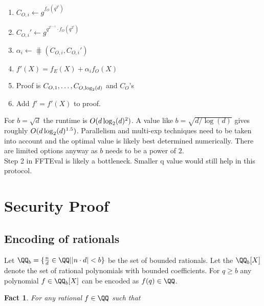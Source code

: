\documentclass[12pt]{article}
\theoremstyle{Definition}
\newtheorem{fact}{Fact}
\begin{document}
\begin{mdframed}
\begin{enumerate}[nolistsep]
		\item \pcind[1] $C_{O,i}\gets g^{f_O(q^{2^i})}$ 
		\item  \pcind[1] $C_{O,i}'\gets g^{q^{2^{i-1}} \cdot f_O(q^{2^i})}$ 
		\item \pcind[1] $\alpha_i\gets\hash(C_{O,i},C_{O,i}')$
		\item \pcind[1] $f'(X)=f_E(X)+\alpha_i f_O(X)$
		\item Proof is $C_{O,1},\dots,C_{O,\log_2(d)}$ and $C_O$'s
		\item Add $f'=f'(X)$ to proof.
	\end{enumerate}
	\end{mdframed}
	For $b=\sqrt{d}$ the runtime is $O(d \log_2(d)^2)$. A value like $b=\sqrt{d/\log(d)}$ gives roughly $O(d\log_2(d)^{1.5})$. Parallelism and multi-exp techniques need to be taken into account and the optimal value is likely best determined numerically. There are limited options anyway as $b$ needs to be a power of $2$.\\ 
Step 2 in FFTEval is likely a bottleneck. Smaller q value would still help in this protocol.
\section{Security Proof}

\subsection{Encoding of rationals}
Let $\QQ_b = \{\frac{n}{d}\in  \QQ | |n \cdot d| < b\}$ be the set of bounded rationals. Let the $\QQ_b[X]$ denote the set of rational polynomials with bounded coefficients. For $q\geq b$ any polynomial $f \in \QQ_b[X]$ can be encoded as $f(q)\in \QQ$. 
\begin{fact}
	For any rational $f \in \QQ$ such that 
\end{fact}
\end{document}
